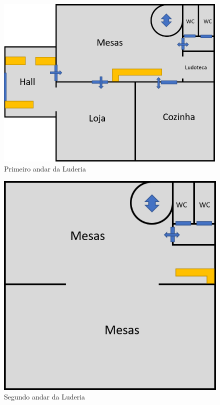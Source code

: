 \begin{figure}[hbt]
    \centering
    \includegraphics[scale=0.8]{imagens/PrimeiroAndar.png}
    \caption{Primeiro andar da Luderia}
    \label{fig:andar1}
\end{figure}

\begin{figure}[hbt]
    \centering
    \includegraphics[scale=0.8]{imagens/SegundoAndar.png}
    \caption{Segundo andar da Luderia}
    \label{fig:andar2}
\end{figure}

